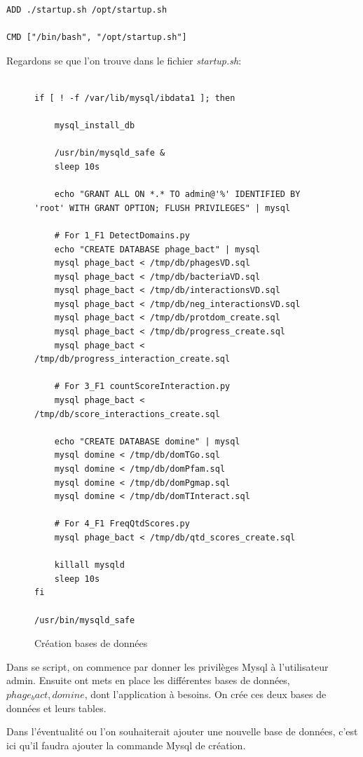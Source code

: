 \begin{lstlisting}[frame=single]
ADD ./startup.sh /opt/startup.sh

CMD ["/bin/bash", "/opt/startup.sh"]
\end{lstlisting}

Regardons se que l'on trouve dans le fichier \emph{startup.sh}:

\begin{figure}[H] 
\centering 
\begin{lstlisting}[frame=single]

if [ ! -f /var/lib/mysql/ibdata1 ]; then

	mysql_install_db

	/usr/bin/mysqld_safe &
	sleep 10s

	echo "GRANT ALL ON *.* TO admin@'%' IDENTIFIED BY 'root' WITH GRANT OPTION; FLUSH PRIVILEGES" | mysql

	# For 1_F1 DetectDomains.py
	echo "CREATE DATABASE phage_bact" | mysql
	mysql phage_bact < /tmp/db/phagesVD.sql
	mysql phage_bact < /tmp/db/bacteriaVD.sql
	mysql phage_bact < /tmp/db/interactionsVD.sql
	mysql phage_bact < /tmp/db/neg_interactionsVD.sql
	mysql phage_bact < /tmp/db/protdom_create.sql
	mysql phage_bact < /tmp/db/progress_create.sql
	mysql phage_bact < /tmp/db/progress_interaction_create.sql

    # For 3_F1 countScoreInteraction.py
	mysql phage_bact < /tmp/db/score_interactions_create.sql

	echo "CREATE DATABASE domine" | mysql
    mysql domine < /tmp/db/domTGo.sql
    mysql domine < /tmp/db/domPfam.sql
    mysql domine < /tmp/db/domPgmap.sql
    mysql domine < /tmp/db/domTInteract.sql

    # For 4_F1 FreqQtdScores.py
	mysql phage_bact < /tmp/db/qtd_scores_create.sql

	killall mysqld
	sleep 10s
fi

/usr/bin/mysqld_safe
\end{lstlisting}
\caption[Création bases de données]{Création bases de données}
\label{fig:createDb} 
\end{figure}

Dans se script, on commence par donner les privilèges Mysql à l'utilisateur admin. Ensuite ont mets en place les différentes bases de données, \emph{$phage_bact, domine$}, dont l'application à besoins. On crée ces deux bases de données et leurs tables.

Dans l'éventualité ou l'on souhaiterait ajouter une nouvelle base de données, c'est ici qu'il faudra ajouter la commande Mysql de création.

